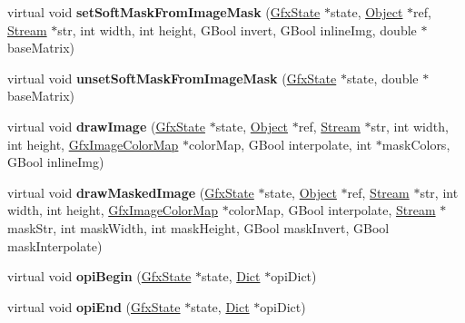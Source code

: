 \begin{DoxyCompactItemize}
\item 
\mbox{\label{class_p_s_output_dev_a2d13f0a86a05dedd762b8fb8154555c0}} 
virtual void {\bfseries set\+Soft\+Mask\+From\+Image\+Mask} (\hyperlink{class_gfx_state}{Gfx\+State} $\ast$state, \hyperlink{class_object}{Object} $\ast$ref, \hyperlink{class_stream}{Stream} $\ast$str, int width, int height, G\+Bool invert, G\+Bool inline\+Img, double $\ast$base\+Matrix)
\item 
\mbox{\label{class_p_s_output_dev_a03e34d5e7a2eb0bd1422c3d8d317e09f}} 
virtual void {\bfseries unset\+Soft\+Mask\+From\+Image\+Mask} (\hyperlink{class_gfx_state}{Gfx\+State} $\ast$state, double $\ast$base\+Matrix)
\item 
\mbox{\label{class_p_s_output_dev_a6d1f1b2c409a262ecaa7ee83fefa4a6f}} 
virtual void {\bfseries draw\+Image} (\hyperlink{class_gfx_state}{Gfx\+State} $\ast$state, \hyperlink{class_object}{Object} $\ast$ref, \hyperlink{class_stream}{Stream} $\ast$str, int width, int height, \hyperlink{class_gfx_image_color_map}{Gfx\+Image\+Color\+Map} $\ast$color\+Map, G\+Bool interpolate, int $\ast$mask\+Colors, G\+Bool inline\+Img)
\item 
\mbox{\label{class_p_s_output_dev_aaf125d70c7fe8e87832f03295160c7cc}} 
virtual void {\bfseries draw\+Masked\+Image} (\hyperlink{class_gfx_state}{Gfx\+State} $\ast$state, \hyperlink{class_object}{Object} $\ast$ref, \hyperlink{class_stream}{Stream} $\ast$str, int width, int height, \hyperlink{class_gfx_image_color_map}{Gfx\+Image\+Color\+Map} $\ast$color\+Map, G\+Bool interpolate, \hyperlink{class_stream}{Stream} $\ast$mask\+Str, int mask\+Width, int mask\+Height, G\+Bool mask\+Invert, G\+Bool mask\+Interpolate)
\item 
\mbox{\label{class_p_s_output_dev_a041ece627c5ee39e65f29260e0198007}} 
virtual void {\bfseries opi\+Begin} (\hyperlink{class_gfx_state}{Gfx\+State} $\ast$state, \hyperlink{class_dict}{Dict} $\ast$opi\+Dict)
\item 
\mbox{\label{class_p_s_output_dev_a743a4d71eb3be35917a3f80e627d57b1}} 
virtual void {\bfseries opi\+End} (\hyperlink{class_gfx_state}{Gfx\+State} $\ast$state, \hyperlink{class_dict}{Dict} $\ast$opi\+Dict)

\end{DoxyCompactItemize}
